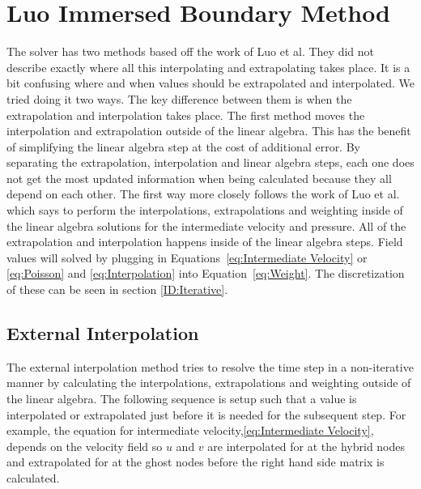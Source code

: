 \documentclass[onehalf,11pt]{beavtex}
\begin{document}
\section{Luo Immersed Boundary Method}
The solver has two methods based off the work of Luo et al\cite{Luo:2012gx}. 
They did not describe exactly where all this interpolating and extrapolating takes place.
It is a bit confusing where and when values should be extrapolated and interpolated.
We tried doing it two ways.
The key difference between them is when the extrapolation and interpolation takes place.
The first method moves the interpolation and extrapolation outside of the linear algebra.
This has the benefit of simplifying the linear algebra step at the cost of additional error.
By separating the extrapolation, interpolation and linear algebra steps, each one does not get the most updated information when being calculated because they all depend on each other.
The first way more closely follows the work of Luo et al. which says to perform the interpolations, extrapolations and weighting inside of the linear algebra solutions for the intermediate velocity and pressure.
All of the extrapolation and interpolation happens inside of the linear algebra steps.
Field values will solved by plugging in Equations~\eqref{eq:Intermediate Velocity} or \eqref{eq:Poisson} and \eqref{eq:Interpolation} into Equation~\eqref{eq:Weight}. 
The discretization of these can be seen in section \ref{ID:Iterative}.

\subsection{External Interpolation}

The external interpolation method tries to resolve the time step in a non-iterative manner by calculating the interpolations, extrapolations and weighting outside of the linear algebra. 
The following sequence is setup such that a value is interpolated or extrapolated just before it is needed for the subsequent step.
For example, the equation for intermediate velocity,\eqref{eq:Intermediate Velocity}, depends on the velocity field so $u$ and $v$ are interpolated for at the hybrid nodes and extrapolated for at the ghost nodes before the right hand side matrix is calculated.
\end{document}
